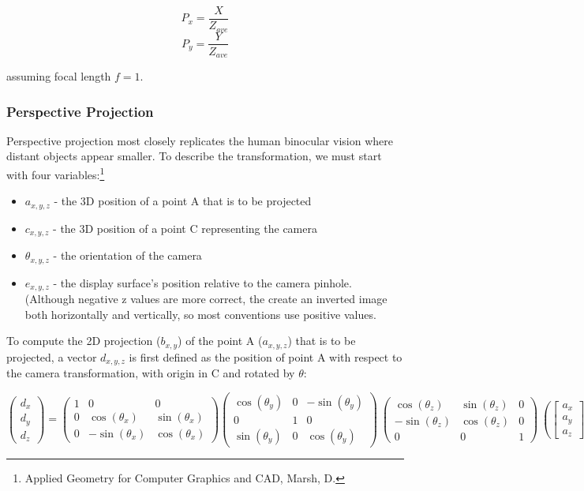 \documentclass{article}
\begin{document}
  \[P_{x} =  \frac{X}{Z_{ave}}\]
  \[P_{y} =  \frac{Y}{Z_{ave}}\]

assuming focal length $f = 1$.

\subsubsection{Perspective Projection}
Perspective projection most closely replicates the human binocular vision where distant objects appear smaller. To describe the transformation, we must start with four variables:\footnote{Applied Geometry for Computer Graphics and CAD, Marsh, D.}

\begin{itemize}
  \item $a_{x, y, z}$ - the 3D position of a point A that is to be projected
  \item $c_{x, y, z}$ - the 3D position of a point C representing the camera
  \item $\theta_{x, y, z}$ - the orientation of the camera
  \item $e_{x, y, z}$ - the display surface's position relative to the camera pinhole. (Although negative z values are more correct, the create an inverted image both horizontally and vertically, so most conventions use positive values.
\end{itemize}

To compute the 2D projection ($b_{x, y}$) of the point A ($a_{x, y, z}$) that is to be projected, a vector $d_{x, y, z}$ is first defined as the position of point A with respect to the camera transformation, with origin in C and rotated by $\theta$:

\[\begin{pmatrix}
  d_{x} \\
  d_{y} \\
  d_{z} 
 \end{pmatrix}
=
\begin{pmatrix}
  1 & 0 & 0 \\
  0 & \cos(\theta_{x}) & \sin(\theta_{x}) \\
  0 &  -\sin(\theta_{x}) & \cos(\theta_{x}) 
 \end{pmatrix}
\begin{pmatrix}
  \cos(\theta_{y}) & 0 & -\sin(\theta_{y}) \\
  0 & 1 & 0 \\
  \sin(\theta_{y}) & 0  & \cos(\theta_{y}) 
 \end{pmatrix}\
\begin{pmatrix}
  \cos(\theta_{z}) & \sin(\theta_{z})  & 0  \\
  -\sin(\theta_{z}) & \cos(\theta_{z}) & 0 \\
  0 & 0  & 1 
 \end{pmatrix}\
\left(
\begin{bmatrix}
  a_{x} \\
  a_{y} \\
  a_{z} 
\end{bmatrix}\
-
\begin{bmatrix}
  c_{x} \\
  c_{y} \\
  c_{z} 
\end{bmatrix}\
\right)\]
\end{document}
